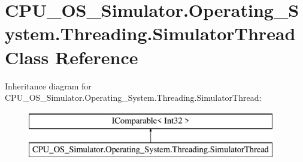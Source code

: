 \hypertarget{class_c_p_u___o_s___simulator_1_1_operating___system_1_1_threading_1_1_simulator_thread}{}\section{C\+P\+U\+\_\+\+O\+S\+\_\+\+Simulator.\+Operating\+\_\+\+System.\+Threading.\+Simulator\+Thread Class Reference}
\label{class_c_p_u___o_s___simulator_1_1_operating___system_1_1_threading_1_1_simulator_thread}
Inheritance diagram for C\+P\+U\+\_\+\+O\+S\+\_\+\+Simulator.\+Operating\+\_\+\+System.\+Threading.\+Simulator\+Thread\+:\begin{figure}[H]
\begin{center}
\leavevmode
\includegraphics[height=2.000000cm]{class_c_p_u___o_s___simulator_1_1_operating___system_1_1_threading_1_1_simulator_thread}
\end{center}
\end{figure}
